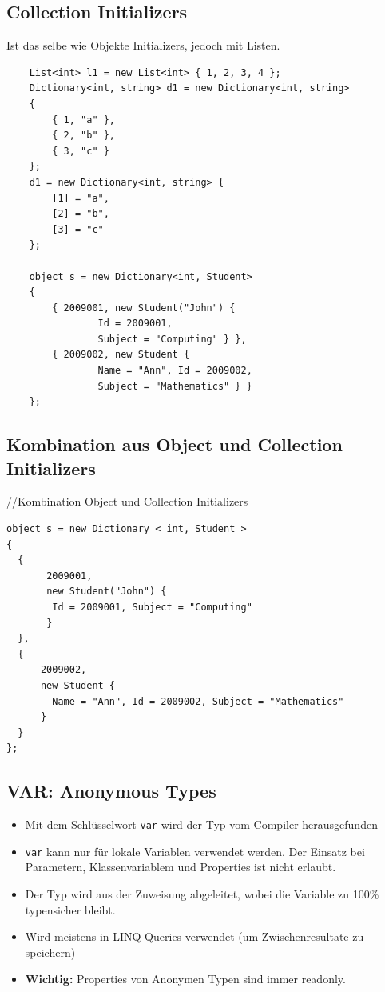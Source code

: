 \documentclass[
a4paper,
oneside,
10pt,
fleqn,
headsepline,
toc=listofnumbered, 
bibliography=totocnumbered]{scrartcl}
\begin{document}
\subsection{Collection Initializers}
Ist das selbe wie Objekte Initializers, jedoch mit Listen.
\begin{lstlisting}
	List<int> l1 = new List<int> { 1, 2, 3, 4 };
	Dictionary<int, string> d1 = new Dictionary<int, string>
	{
		{ 1, "a" },
		{ 2, "b" },
		{ 3, "c" }
	};
	d1 = new Dictionary<int, string> {
		[1] = "a",
		[2] = "b",
		[3] = "c"
	};
	
	object s = new Dictionary<int, Student>
	{
		{ 2009001, new Student("John") {
				Id = 2009001,
				Subject = "Computing" } },
		{ 2009002, new Student {
				Name = "Ann", Id = 2009002,
				Subject = "Mathematics" } }
	};
\end{lstlisting}
\subsection{Kombination aus Object und Collection Initializers}
//Kombination Object und Collection Initializers
\begin{lstlisting}
object s = new Dictionary < int, Student >
{
  {
       2009001,
       new Student("John") {
        Id = 2009001, Subject = "Computing"
       }
  },
  {
      2009002,
      new Student {
        Name = "Ann", Id = 2009002, Subject = "Mathematics"
      }
  }
};
\end{lstlisting}

\subsection{VAR: Anonymous Types}
\begin{itemize}
	\item Mit dem Schlüsselwort \lstinline|var| wird der Typ vom Compiler herausgefunden
	\item \lstinline|var| kann nur für lokale Variablen verwendet werden. Der Einsatz bei Parametern, Klassenvariablem und Properties ist nicht erlaubt.
	\item Der Typ wird aus der Zuweisung abgeleitet, wobei die Variable zu 100\% typensicher bleibt.
	\item Wird meistens in LINQ Queries verwendet (um Zwischenresultate zu speichern)
	\item \textbf{Wichtig:} Properties von Anonymen Typen sind immer readonly.
\end{itemize}
\end{document}
